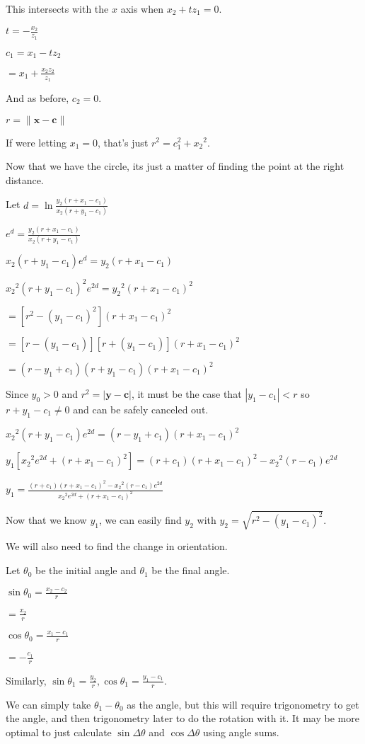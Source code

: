 This intersects with the $x$ axis when $x_2+tz_1 = 0$.

$t = -\frac{x_2}{z_1}$

$c_1 = x_1-tz_2$

$= x_1+\frac{x_2z_2}{z_1}$


And as before, $c_2 = 0$.

$r = \|\textbf{x}-\textbf{c}\|$

If were letting $x_1 = 0$, that's just $r^2 = c_1^2+{x_2}^2$.

Now that we have the circle, its just a matter of finding the point at the right distance.

Let $d = \ln\frac{y_2(r+x_1-c_1)}{x_2(r+y_1-c_1)}$

$e^d = \frac{y_2(r+x_1-c_1)}{x_2(r+y_1-c_1)}$

$x_2(r+y_1-c_1)e^d = y_2(r+x_1-c_1)$

${x_2}^2(r+y_1-c_1)^2e^{2d} = {y_2}^2(r+x_1-c_1)^2$

$= [r^2-(y_1-c_1)^2](r+x_1-c_1)^2$

$= [r-(y_1-c_1)][r+(y_1-c_1)](r+x_1-c_1)^2$

$= (r-y_1+c_1)(r+y_1-c_1)(r+x_1-c_1)^2$

Since $y_0 > 0$ and $r^2 = |\textbf{y}-\textbf{c}|$, it must be the case that $|y_1-c_1| < r$ so $r+y_1-c_1 \neq 0$ and can be safely canceled out.

${x_2}^2(r+y_1-c_1)e^{2d} = (r-y_1+c_1)(r+x_1-c_1)^2$

$y_1[{x_2}^2e^{2d}+(r+x_1-c_1)^2] = (r+c_1)(r+x_1-c_1)^2-{x_2}^2(r-c_1)e^{2d}$

$y_1 = \frac{(r+c_1)(r+x_1-c_1)^2-{x_2}^2(r-c_1)e^{2d}}{{x_2}^2e^{2d}+(r+x_1-c_1)^2}$

Now that we know $y_1$, we can easily find $y_2$ with $y_2 = \sqrt{r^2-({y_1}-c_1)^2}$.

We will also need to find the change in orientation.

Let $\theta_0$ be the initial angle and $\theta_1$ be the final angle.

$\sin \theta_0 = \frac{x_2-c_2}{r}$

$= \frac{x_2}{r}$

$\cos \theta_0 = \frac{x_1-c_1}{r}$

$= -\frac{c_1}{r}$

Similarly, $\sin \theta_1 = \frac{y_2}{r}, \cos \theta_1 = \frac{y_1-c_1}{r}$.

We can simply take $\theta_1-\theta_0$ as the angle, but this will require trigonometry to get the angle, and then trigonometry later to do the rotation with it. It may be more optimal to just calculate $\sin \Delta\theta$ and $\cos \Delta\theta$ using angle sums.

